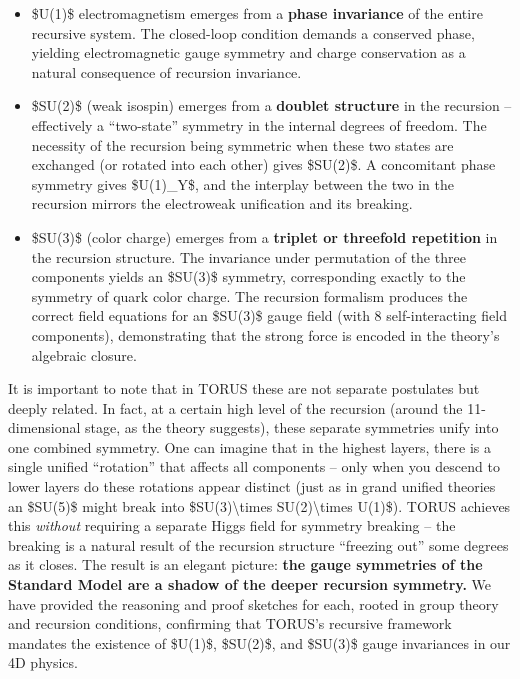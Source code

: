 \documentclass[
]{article}
\begin{document}
\begin{itemize}
\item
  \$U(1)\$ electromagnetism emerges from a \textbf{phase invariance} of
  the entire recursive system. The closed-loop condition demands a
  conserved phase, yielding electromagnetic gauge symmetry and charge
  conservation as a natural consequence of recursion invariance.
\item
  \$SU(2)\$ (weak isospin) emerges from a \textbf{doublet structure} in
  the recursion -- effectively a ``two-state'' symmetry in the internal
  degrees of freedom\hspace{0pt}. The necessity of the recursion being
  symmetric when these two states are exchanged (or rotated into each
  other) gives \$SU(2)\$. A concomitant phase symmetry gives
  \$U(1)\_Y\$, and the interplay between the two in the recursion
  mirrors the electroweak unification and its breaking\hspace{0pt}.
\item
  \$SU(3)\$ (color charge) emerges from a \textbf{triplet or threefold
  repetition} in the recursion structure\hspace{0pt}. The invariance
  under permutation of the three components yields an \$SU(3)\$
  symmetry, corresponding exactly to the symmetry of quark color charge.
  The recursion formalism produces the correct field equations for an
  \$SU(3)\$ gauge field (with 8 self-interacting field components),
  demonstrating that the strong force is encoded in the theory's
  algebraic closure\hspace{0pt}.
\end{itemize}

It is important to note that in TORUS these are not separate postulates
but deeply related. In fact, at a certain high level of the recursion
(around the 11-dimensional stage, as the theory suggests), these
separate symmetries unify into one combined symmetry\hspace{0pt}. One
can imagine that in the highest layers, there is a single unified
``rotation'' that affects all components -- only when you descend to
lower layers do these rotations appear distinct (just as in grand
unified theories an \$SU(5)\$ might break into
\$SU(3)\textbackslash times SU(2)\textbackslash times U(1)\$). TORUS
achieves this \emph{without} requiring a separate Higgs field for
symmetry breaking -- the breaking is a natural result of the recursion
structure ``freezing out'' some degrees as it closes\hspace{0pt}. The
result is an elegant picture: \textbf{the gauge symmetries of the
Standard Model are a shadow of the deeper recursion symmetry.} We have
provided the reasoning and proof sketches for each, rooted in group
theory and recursion conditions, confirming that TORUS's recursive
framework mandates the existence of \$U(1)\$, \$SU(2)\$, and \$SU(3)\$
gauge invariances in our 4D physics.
\end{document}
